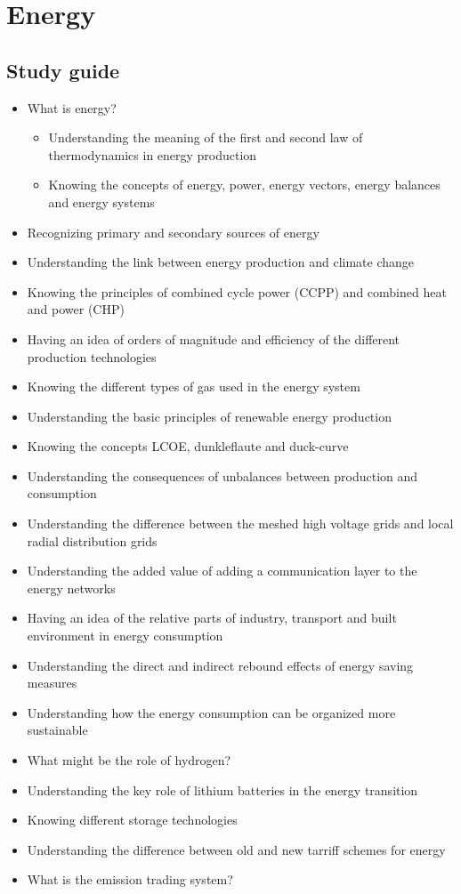 \documentclass[../summary.tex]{subfiles}
\begin{document}
	
	\section{Energy}
	
	\subsection{Study guide}
	\begin{itemize} 
		\setlength{\itemsep}{0pt}
		\item What is energy?
		\begin{itemize}
			\item Understanding the meaning of the first and second law of thermodynamics in energy production
			\item Knowing the concepts of energy, power, energy vectors, energy balances and energy systems
		\end{itemize}
		\item Recognizing primary and secondary sources of energy
		\item Understanding the link between energy production and climate change
		\item Knowing the principles of combined cycle power (CCPP) and combined heat and power (CHP)
		\item Having an idea of orders of magnitude and efficiency of the different production technologies
		\item Knowing the different types of gas used in the energy system
		\item Understanding the basic principles of renewable energy production
		\item Knowing the concepts LCOE, dunkleflaute and duck-curve
		\item Understanding the consequences of unbalances between production and consumption
		\item Understanding the difference between the meshed high voltage grids and local radial distribution grids
		\item Understanding the added value of adding a communication layer to the energy networks
		\item Having an idea of the relative parts of industry, transport and built environment in energy consumption
		\item Understanding the direct and indirect rebound effects of energy saving measures
		\item Understanding how the energy consumption can be organized more sustainable
		\item What might be the role of hydrogen?
		\item Understanding the key role of lithium batteries in the energy transition
		\item Knowing different storage technologies
		\item Understanding the difference between old and new tarriff schemes for energy
		\item What is the emission trading system?
	\end{itemize}
	
\end{document}
